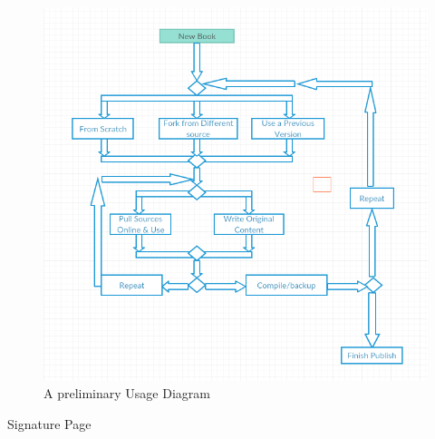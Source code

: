 \documentclass[letterpaper, 10pt, draftclsnofoot, compsoc, onecolumn]{IEEEtran}
\begin{document}
{{{\begin{figure}[ht!]
\centering
\includegraphics[width=150mm]{usage_diagram.png}
\caption{A preliminary Usage Diagram}
\end{figure}

\bigskip

\newpage
\centerline{\sc \large Signature Page}
\vspace{5pc}


\centering

}}}
\end{document}
